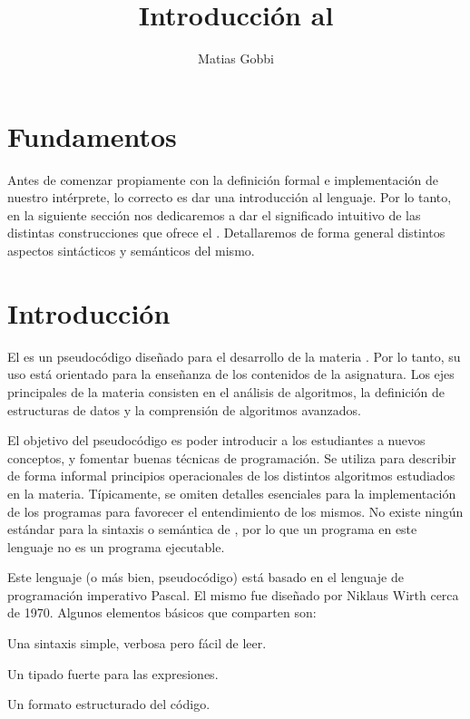 \documentclass{article}
\begin{document}
\title{Introducción al \Lang}
\author{Matias Gobbi}
\maketitle

\section*{Fundamentos}

Antes de comenzar propiamente con la definición formal e implementación de nuestro intérprete, lo correcto es dar una introducción al lenguaje.
Por lo tanto, en la siguiente sección nos dedicaremos a dar el significado intuitivo de las distintas construcciones que ofrece el \Lang.
Detallaremos de forma general distintos aspectos sintácticos y semánticos del mismo.

\section{Introducción}

El \Lang\space es un pseudocódigo diseñado para el desarrollo de la materia \Mat.
Por lo tanto, su uso está orientado para la enseñanza de los contenidos de la asignatura.
Los ejes principales de la materia consisten en el análisis de algoritmos, la definición de estructuras de datos y la comprensión de algoritmos avanzados.

El objetivo del pseudocódigo es poder introducir a los estudiantes a nuevos conceptos, y fomentar buenas técnicas de programación.
Se utiliza para describir de forma informal principios operacionales de los distintos algoritmos estudiados en la materia.
Típicamente, se omiten detalles esenciales para la implementación de los programas para favorecer el entendimiento de los mismos.
No existe ningún estándar para la sintaxis o semántica de \Lang, por lo que un programa en este lenguaje no es un programa ejecutable.

Este lenguaje (o más bien, pseudocódigo) está basado en el lenguaje de programación imperativo Pascal.
El mismo fue diseñado por Niklaus Wirth cerca de 1970.
Algunos elementos básicos que comparten son:
\begin{enumerate*}
\item Una sintaxis simple, verbosa pero fácil de leer.
\item Un tipado fuerte para las expresiones.
\item Un formato estructurado del código.
\end{enumerate*}
\end{document}
